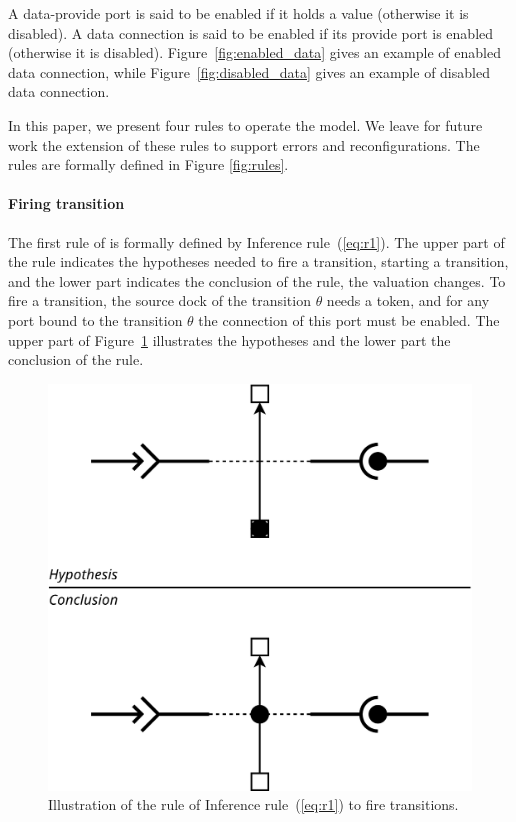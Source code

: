 A data-provide port is said to be enabled if it holds a value (otherwise it is disabled).
A data connection is said to be enabled if its provide port is enabled (otherwise it is
disabled).
Figure~\ref{fig:enabled_data} gives an example of enabled data connection,
while Figure~\ref{fig:disabled_data} gives an example of disabled data connection.
    
In this paper, we present four rules to operate the \mad model. We
leave for future work the extension of these rules to support errors
and reconfigurations. The rules are formally defined in
Figure \ref{fig:rules}.

\paragraph{Firing transition}{

The first rule of \mad is formally defined by
Inference rule~(\ref{eq:r1}). The upper part of the rule indicates the
hypotheses needed to fire a transition, \ie starting a transition,
and the lower part indicates the conclusion of the rule, \ie the valuation
changes. To fire a transition, the source dock of the transition
$\theta$ needs a token, and for any port bound to the transition
$\theta$ the connection of this port must be enabled.
The upper part of Figure~\ref{fig:r1} illustrates the
hypotheses and the lower part the conclusion of the rule.

\begin{figure}[t]
\begin{center}
  \includegraphics[width=0.55\columnwidth]{./images/firing.pdf}
\end{center}
\caption{Illustration of the rule of Inference rule~(\ref{eq:r1}) to fire transitions.}
\label{fig:r1}
\end{figure}

}

